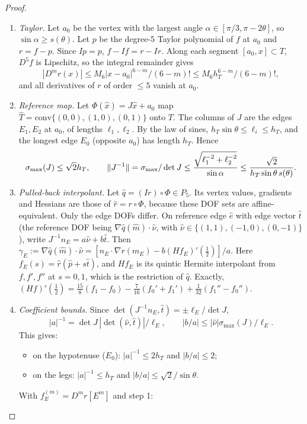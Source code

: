 \begin{proof}
\begin{enumerate}[label=\arabic*.]
\item \emph{Taylor.} Let $a_0$ be the vertex with the largest angle $\alpha\in[\pi/3,\pi-2\theta]$, so
$\sin\alpha\ge s(\theta)$. Let $p$ be the degree-5 Taylor polynomial of $f$ at $a_0$ and $r=f-p$. Since $Ip=p$,
$f-If=r-Ir$. Along each segment $[a_0,x]\subset T$, $D^5f$ is Lipschitz, so the integral remainder gives
\[|D^mr(x)|\le M_6|x-a_0|^{6-m}/(6-m)!\le M_6h_T^{6-m}/(6-m)!,\]
and all derivatives of $r$ of order $\le5$ vanish at $a_0$.
\item \emph{Reference map.} Let $\Phi(\hat x)=J\hat x+a_0$ map $\hat T=\mathrm{conv}\{(0,0),(1,0),(0,1)\}$ onto $T$. The columns
of $J$ are the edges $E_1,E_2$ at $a_0$, of lengths $\ell_1,\ell_2$. By the law of sines,
$h_T\sin\theta\le\ell_i\le h_T$, and the longest edge $E_0$ (opposite $a_0$) has length $h_T$. Hence
\[\sigma_{\max}(J)\le\sqrt2h_T,\qquad \lVert J^{-1}\rVert=\sigma_{\max}/\det J\le\frac{\sqrt{\ell_1^{-2}+\ell_2^{-2}}}{\sin\alpha}\le\frac{\sqrt2}{h_T\sin\theta\,s(\theta)} .\]
\item \emph{Pulled-back interpolant.} Let $\hat q=(Ir)\circ\Phi\in P_5$. Its vertex values, gradients and Hessians are those of
$\hat r=r\circ\Phi$, because these DOF sets are affine-equivalent. Only the edge DOFs differ. On reference edge $\hat e$ with
edge vector $\hat t$ (the reference DOF being $\nabla\hat q(\hat m)\cdot\hat\nu$, with
$\hat\nu\in\{(1,1),(-1,0),(0,-1)\}$), write $J^{-1}n_E=a\hat\nu+b\hat t$. Then
$\gamma_E:=\nabla\hat q(\hat m)\cdot\hat\nu=[n_E\cdot\nabla r(m_E)-b(Hf_E)'(\tfrac12)]/a$. Here $f_E(s)=\hat r(\hat p+s\hat t)$, and
$Hf_E$ is its quintic Hermite interpolant from $f,f',f''$ at $s=0,1$, which is the restriction of $\hat q$. Exactly,
$(Hf)'(\tfrac12)=\tfrac{15}8(f_1-f_0)-\tfrac7{16}(f_0'+f_1')+\tfrac1{32}(f_1''-f_0'')$.
\item \emph{Coefficient bounds.} Since $\det(J^{-1}n_E,\hat t)=\pm\ell_E/\det J$,
\[|a|^{-1}=\det J\,|\det(\hat\nu,\hat t)|/\ell_E,\qquad |b/a|\le|\hat\nu|\sigma_{\max}(J)/\ell_E .\]
This gives:
\begin{itemize}
\item on the hypotenuse ($E_0$): $|a|^{-1}\le2h_T$ and $|b/a|\le2$;
\item on the legs: $|a|^{-1}\le h_T$ and $|b/a|\le\sqrt2/\sin\theta$.
\end{itemize}
With $f_E^{(m)}=D^mr[E^m]$ and step 1:
\begin{itemize}

\end{itemize}
\end{enumerate}
\end{proof}
